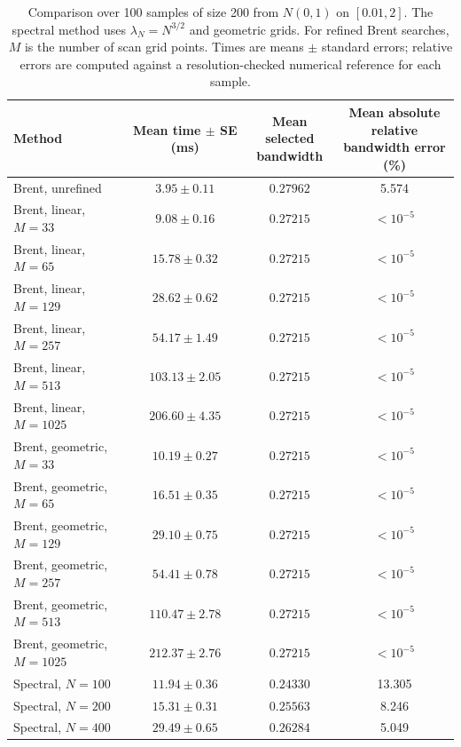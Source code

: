 \begin{table}[htbp]
    \centering
    \small
    \setlength{\tabcolsep}{4pt}
    \begin{tabular}{lccc}
        \toprule
        Method & \shortstack{Mean time $\pm$ SE\\(ms)} & \shortstack{Mean selected\\bandwidth} & \shortstack{Mean absolute relative\\bandwidth error (\%)} \\
        \midrule
        Brent, unrefined & $3.95 \pm 0.11$ & $0.27962$ & 5.574 \\
        \midrule
        Brent, linear, $M=33$ & $9.08 \pm 0.16$ & $0.27215$ & $<10^{-5}$ \\
        Brent, linear, $M=65$ & $15.78 \pm 0.32$ & $0.27215$ & $<10^{-5}$ \\
        Brent, linear, $M=129$ & $28.62 \pm 0.62$ & $0.27215$ & $<10^{-5}$ \\
        Brent, linear, $M=257$ & $54.17 \pm 1.49$ & $0.27215$ & $<10^{-5}$ \\
        Brent, linear, $M=513$ & $103.13 \pm 2.05$ & $0.27215$ & $<10^{-5}$ \\
        Brent, linear, $M=1025$ & $206.60 \pm 4.35$ & $0.27215$ & $<10^{-5}$ \\
        \midrule
        Brent, geometric, $M=33$ & $10.19 \pm 0.27$ & $0.27215$ & $<10^{-5}$ \\
        Brent, geometric, $M=65$ & $16.51 \pm 0.35$ & $0.27215$ & $<10^{-5}$ \\
        Brent, geometric, $M=129$ & $29.10 \pm 0.75$ & $0.27215$ & $<10^{-5}$ \\
        Brent, geometric, $M=257$ & $54.41 \pm 0.78$ & $0.27215$ & $<10^{-5}$ \\
        Brent, geometric, $M=513$ & $110.47 \pm 2.78$ & $0.27215$ & $<10^{-5}$ \\
        Brent, geometric, $M=1025$ & $212.37 \pm 2.76$ & $0.27215$ & $<10^{-5}$ \\
        \midrule
        Spectral, $N=100$ & $11.94 \pm 0.36$ & $0.24330$ & 13.305 \\
        Spectral, $N=200$ & $15.31 \pm 0.31$ & $0.25563$ & 8.246 \\
        Spectral, $N=400$ & $29.49 \pm 0.65$ & $0.26284$ & 5.049 \\
        \bottomrule
    \end{tabular}
    \caption{Comparison over 100 samples of size 200 from $N(0,1)$ on $[0.01,2]$. The spectral method uses $\lambda_N=N^{3/2}$ and geometric grids. For refined Brent searches, $M$ is the number of scan grid points. Times are means $\pm$ standard errors; relative errors are computed against a resolution-checked numerical reference for each sample.}
\end{table}
